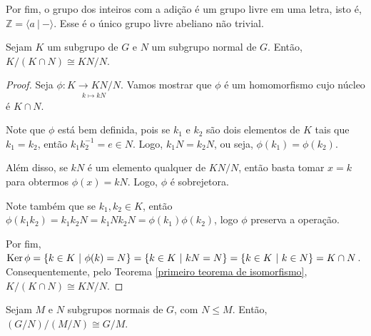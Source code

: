 	\begin{example}
	Por fim, o grupo dos inteiros com a adição é um grupo livre em uma letra, isto é,
	$\mathbb{Z} = \langle a \ | \ - \rangle$. Esse é o único grupo livre abeliano não trivial.
	\end{example}
	\begin{theorem}
	\label{segundo teorema de isomorfismos}
		Sejam $K$ um subgrupo de $G$ e $N$ um subgrupo normal de $G$. Então, $K/(K\cap N)\cong KN/N$.
	\end{theorem}
	\begin{proof}
		Seja $\phi:\underset{k\mapsto kN}{K\to KN/N}$. Vamos mostrar que $\phi$ é um homomorfismo cujo 
		núcleo é $K\cap N$.
		
		\par\vspace{0.3cm} Note que $\phi$ está bem definida, pois se $k_1$ e $k_2$ são dois elementos de 
		$K$ tais que $k_1=k_2$, então $k_1k_2^{-1} = e\in N$. Logo, $k_1N = k_2N$, 
		ou seja, $\phi(k_1)=\phi(k_2)$.	
		
		\par\vspace{0.3cm} Além disso, se $kN$ é um elemento qualquer de $KN/N$, então basta tomar $x=k$ 
		para obtermos $\phi(x)=kN$. Logo, $\phi$ é sobrejetora.
		
		\par\vspace{0.3cm} Note também que se $k_1,k_2\in K$, então
		$\phi(k_1k_2)=k_1k_2N=k_1Nk_2N=\phi(k_1)\phi(k_2)$, logo $\phi$ preserva a operação.
		
		\par\vspace{0.3cm} Por fim, $\operatorname{Ker}\phi= \{ k\in K \ | \ \phi(k) = N \} 
		= \{ k\in K \ | \ kN = N \}= \{ k\in K \ | \ k\in N \} = K\cap N$. Consequentemente, pelo 
		Teorema \ref{primeiro teorema de isomorfismo},  $K/(K\cap N)\cong KN/N$.  
	\end{proof}
	\begin{theorem}
	\label{terceiro teorema de isomorfismos}
		Sejam $M$ e $N$ subgrupos normais de $G$, com $N\leq M$. Então, $(G/N)/(M/N)\cong G/M$.
	\end{theorem}
